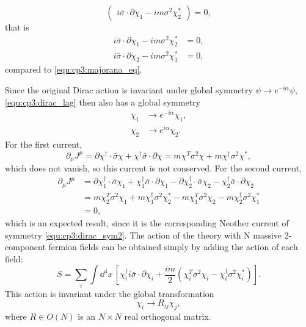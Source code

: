 \begin{problembody}
\begin{equation*}
\begin{pmatrix}
            i\bar{\sigma}\cdot\partial\chi_1 - im\sigma^2\chi_2^\ast
        \end{pmatrix} = 0,
    \end{equation*}
    that is
    \begin{subequations}\label{equ:cp3:dirac_eq_2}
        \begin{align}
            i\bar{\sigma}\cdot\partial\chi_1 - im\sigma^2\chi_2^\ast & = 0, \\
            i\bar{\sigma}\cdot\partial\chi_2 - im\sigma^2\chi_1^\ast & = 0,
        \end{align}
    \end{subequations}
    compared to \eqref{equ:cp3:majorana_eq}.

    \item Since the original Dirac action is invariant under global symmetry $\psi \to e^{-i\alpha}\psi$, \eqref{equ:cp3:dirac_lag} then also has a global symmetry
    \begin{subequations}\label{equ:cp3:dirac_sym2}
        \begin{align}
            \chi_1 & \to e^{-i\alpha}\chi_1, \\
            \chi_2 & \to e^{i\alpha}\chi_2.
        \end{align}
    \end{subequations}
    For the first current,
    \begin{equation*}
        \partial_\mu J^\mu = \partial\chi^\dagger\cdot\bar{\sigma} \chi + \chi^\dagger\bar{\sigma}\cdot\partial\chi
        = m\chi^T\sigma^2\chi + m\chi^\dagger\sigma^2\chi^\ast,
    \end{equation*}
    which does not vanish, so this current is not conserved\needverify.
    For the second current,
    \begin{align*}
        \partial_\mu J^\mu & = \partial\chi_1^\dagger\cdot\bar{\sigma}\chi_1 + \chi_1^\dagger\bar{\sigma}\cdot\partial\chi_1
        - \partial\chi_2^\dagger\cdot\bar{\sigma}\chi_2 - \chi_2^\dagger\bar{\sigma}\cdot\partial\chi_2 \\
        & = m\chi_2^T\sigma^2\chi_1 + m\chi_1^\dagger\sigma^2\chi_2^\ast - m\chi_1^T\sigma^2\chi_2 - m\chi_2^\dagger\sigma^2\chi_1^\ast\\
        & = 0,
    \end{align*}
    which is an expected result, since it is the corresponding Neother current of symmetry \eqref{equ:cp3:dirac_sym2}.
    The action of the theory with N massive 2-component fermion fields can be obtained simply by adding the action of each field:
    \begin{equation*}
        S = \sum_i \int \dd^4x \, \left[\chi_i^\dagger i\bar{\sigma}\cdot\partial\chi_i + \frac{im}{2}\left(\chi_i^T\sigma^2\chi_i - \chi_i^\dagger\sigma^2\chi_i^\ast\right)\right].
    \end{equation*}
    This action is invariant under the global transformation
    \begin{equation*}
        \chi_i \to R_{ij}\chi_j,
    \end{equation*}
    where $R \in O(N)$ is an $N \times N$ real orthogonal matrix.


\end{problembody}
